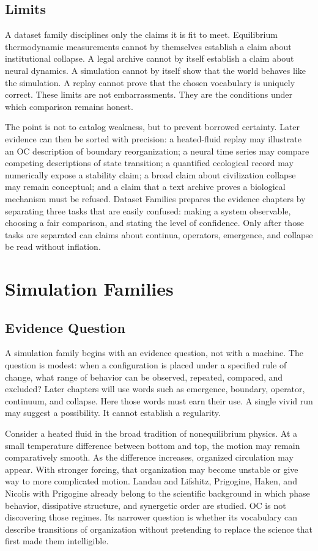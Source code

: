 \documentclass[11pt,a4paper,openany]{book}
\begin{document}
\subsection{Limits}
A dataset family disciplines only the claims it is fit to meet. Equilibrium thermodynamic measurements cannot by themselves establish a claim about institutional collapse. A legal archive cannot by itself establish a claim about neural dynamics. A simulation cannot by itself show that the world behaves like the simulation. A replay cannot prove that the chosen vocabulary is uniquely correct. These limits are not embarrassments. They are the conditions under which comparison remains honest. \cite{wilson_renormalization,landau_stat_physics}\par
The point is not to catalog weakness, but to prevent borrowed certainty. Later evidence can then be sorted with precision: a heated-fluid replay may illustrate an OC description of boundary reorganization; a neural time series may compare competing descriptions of state transition; a quantified ecological record may numerically expose a stability claim; a broad claim about civilization collapse may remain conceptual; and a claim that a text archive proves a biological mechanism must be refused. Dataset Families prepares the evidence chapters by separating three tasks that are easily confused: making a system observable, choosing a fair comparison, and stating the level of confidence. Only after those tasks are separated can claims about continua, operators, emergence, and collapse be read without inflation.\par
\section{Simulation Families}
\subsection{Evidence Question}
A simulation family begins with an evidence question, not with a machine. The question is modest: when a configuration is placed under a specified rule of change, what range of behavior can be observed, repeated, compared, and excluded? Later chapters will use words such as emergence, boundary, operator, continuum, and collapse. Here those words must earn their use. A single vivid run may suggest a possibility. It cannot establish a regularity. \cite{landau_stat_physics,prigogine_dissipative}\par
Consider a heated fluid in the broad tradition of nonequilibrium physics. At a small temperature difference between bottom and top, the motion may remain comparatively smooth. As the difference increases, organized circulation may appear. With stronger forcing, that organization may become unstable or give way to more complicated motion. Landau and Lifshitz, Prigogine, Haken, and Nicolis with Prigogine already belong to the scientific background in which phase behavior, dissipative structure, and synergetic order are studied. OC is not discovering those regimes. Its narrower question is whether its vocabulary can describe transitions of organization without pretending to replace the science that first made them intelligible.\par
\end{document}
